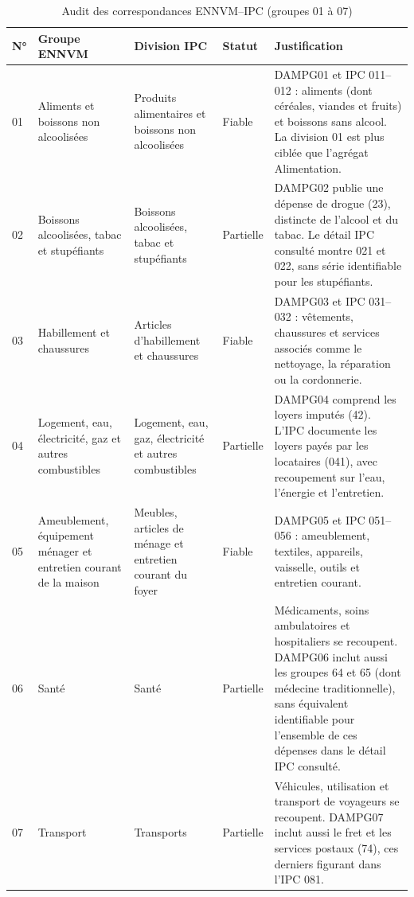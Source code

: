 \begin{table}[!ht]
\centering\small
\setlength{\tabcolsep}{4pt}
\caption{Audit des correspondances ENNVM--IPC (groupes 01 à 07)}\label{tab:correspondance}
\begin{tabular}{@{}l>{\raggedright\arraybackslash}p{}>{\raggedright\arraybackslash}p{}l>{\raggedright\arraybackslash}p{}@{}}
\hline
N° & Groupe ENNVM & Division IPC & Statut & Justification \\
\hline
01 & Aliments et boissons non alcoolisées & Produits alimentaires et boissons non alcoolisées & Fiable & DAMPG01 et IPC 011--012 : aliments (dont céréales, viandes et fruits) et boissons sans alcool. La division 01 est plus ciblée que l'agrégat Alimentation. \\
\hline
02 & Boissons alcoolisées, tabac et stupéfiants & Boissons alcoolisées, tabac et stupéfiants & Partielle & DAMPG02 publie une dépense de drogue (23), distincte de l'alcool et du tabac. Le détail IPC consulté montre 021 et 022, sans série identifiable pour les stupéfiants. \\
\hline
03 & Habillement et chaussures & Articles d'habillement et chaussures & Fiable & DAMPG03 et IPC 031--032 : vêtements, chaussures et services associés comme le nettoyage, la réparation ou la cordonnerie. \\
\hline
04 & Logement, eau, électricité, gaz et autres combustibles & Logement, eau, gaz, électricité et autres combustibles & Partielle & DAMPG04 comprend les loyers imputés (42). L'IPC documente les loyers payés par les locataires (041), avec recoupement sur l'eau, l'énergie et l'entretien. \\
\hline
05 & Ameublement, équipement ménager et entretien courant de la maison & Meubles, articles de ménage et entretien courant du foyer & Fiable & DAMPG05 et IPC 051--056 : ameublement, textiles, appareils, vaisselle, outils et entretien courant. \\
\hline
06 & Santé & Santé & Partielle & Médicaments, soins ambulatoires et hospitaliers se recoupent. DAMPG06 inclut aussi les groupes 64 et 65 (dont médecine traditionnelle), sans équivalent identifiable pour l'ensemble de ces dépenses dans le détail IPC consulté. \\
\hline
07 & Transport & Transports & Partielle & Véhicules, utilisation et transport de voyageurs se recoupent. DAMPG07 inclut aussi le fret et les services postaux (74), ces derniers figurant dans l'IPC 081. \\
\hline
\end{tabular}
\end{table}
